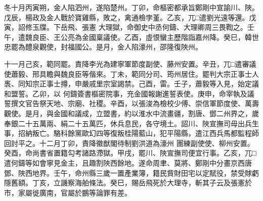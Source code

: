 \begin{pinyinscope}
 冬十月丙寅朔，金人陷泗州，遂陷楚州。丁卯，命樞密都承旨鄭剛中宣諭川、陜。戊辰，楊政及金人戰於寶雞縣，敗之，禽通檢孛堇。乙亥，兀□遣劉光遠等還。戊寅，詔修玉牒。下岳飛、張憲
 大理獄，命御史中丞何鑄、大理卿周三畏鞫之。壬午，遣魏良臣、王公亮為金國稟議使。乙酉，虛恨蠻主歷階詣嘉州降。癸巳，韓世忠罷為醴泉觀使，封福國公。是月，金人陷濠州，邵隆復陜州。



 十一月己亥，範同罷。責降李光為建寧軍節度副使、藤州安置。辛丑，兀□遣審議使蕭毅、邢具瞻與魏良臣等偕來。丁未，範同分司、筠州居住。罷判大宗正事士人褭、同知宗正事士撙，申嚴戚里宗室謁禁。己酉，雷。壬子，蕭毅等入見，始定議和盟誓。乙卯，以
 何鑄簽書樞密院事，充金國報謝進誓表使。庚申，命宰執及議誓撰文官告祭天地、宗廟、社稷。辛酉，以張浚為檢校少傅、崇信軍節度使、萬壽觀使。是月，與金國和議成，立盟書，約以淮水中流畫疆，割唐、鄧二州界之，歲奉銀二十五萬兩、絹二十五萬匹，休兵息民，各守境土。詔川、陜宣撫司毋出兵生事，招納叛亡。駱科餘黨歐幻四等復叛桂陽藍山，犯平陽縣，遣江西兵馬都監程師回討平之。十二月丁卯，責降徽猷閣待制劉洪道為濠州
 團練副使使、柳州安置。癸酉，命尚書省置籍勾考諸路滯獄。甲戌，罷川、陜宣撫司便宜行事。乙亥，兀□遣何鑄等如會寧見金主，且趣割陜西餘地。遂命周聿、莫將、鄭剛中分畫京西唐鄧、陜西地界。壬午，命州縣三歲一置產業簿，籍民貲財田宅以定賦役，禁受賕虧隱舊額。丁亥，立譏察海舶條法。癸巳，賜岳飛死於大理寺，斬其子云及張憲於市，家屬徙廣南，官屬於鵬等論罪有差。



\end{pinyinscope}